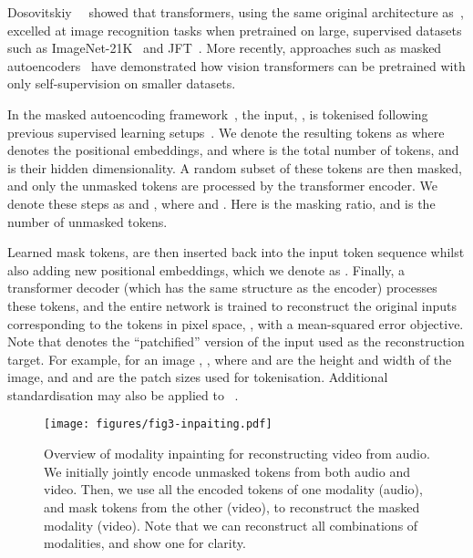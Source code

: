 \documentclass[10pt,twocolumn,letterpaper]{article}
\begin{document}
Dosovitskiy~\etal~\cite{dosovitskiy_iclr_2021} showed that transformers, using the same original architecture as~\cite{vaswani_neurips_2017}, excelled at image recognition tasks when pretrained on large, supervised datasets such as ImageNet-21K~\cite{deng_cvpr_2009} and JFT~\cite{sun_iccv_2017}.
More recently, approaches such as masked autoencoders~\cite{he2022masked} have demonstrated how vision transformers can be pretrained with only self-supervision on smaller datasets.

In the masked autoencoding framework~\cite{he2022masked}, the input, , is tokenised following previous supervised learning setups~\cite{dosovitskiy_iclr_2021,arnab2021vivit,gong2021ast}.
We denote the resulting tokens as  where  denotes the positional embeddings, and
 where  is the total number of tokens, and  is their hidden dimensionality.
A random subset of these tokens are then masked, and only the unmasked tokens are processed by the transformer encoder.
We denote these steps as  and , where  and .
Here  is the masking ratio, and  is the number of unmasked tokens.

Learned mask tokens,  are then inserted back into the input token sequence whilst also adding new positional embeddings, which we denote as . 
Finally, a transformer decoder (which has the same structure as the encoder) processes these tokens, and the entire network is trained to reconstruct the original inputs corresponding to the tokens in pixel space, , with a mean-squared error objective.
Note that  denotes the ``patchified'' version of the input  used as the reconstruction target.
For example, for an image ,  , where  and  are the height and width of the image, and  and  are the patch sizes used for tokenisation.
Additional standardisation may also be applied to ~\cite{he2022masked,tong2022videomae}.

\begin{figure*}[t]
    \centering
    \vspace{-1\baselineskip}
    \texttt{[image: figures/fig3-inpaiting.pdf]}
    \vspace{-0.6\baselineskip}
    \caption{
    	Overview of modality inpainting for reconstructing video from audio.
    	We initially jointly encode unmasked tokens from both audio and video.
    	Then, we use all the encoded tokens of one modality (\ie audio), and mask tokens from the other (\ie video), to reconstruct the masked modality (\ie video).
    	Note that we can reconstruct all combinations of modalities, and show one for clarity.
    		}
	\vspace{-1.5\baselineskip}
    \label{fig:model_inpainting}
\end{figure*} 
\end{document}
